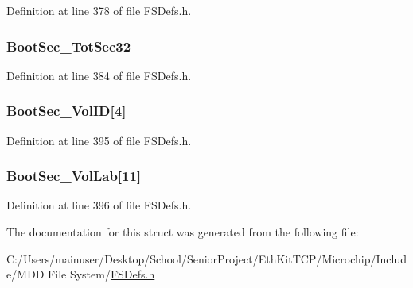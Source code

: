 Definition at line 378 of file F\+S\+Defs.\+h.

\hypertarget{struct___b_p_b___f_a_t32_a867bdbe858dc39c8c08816c22e136180}{}
\subsubsection[{Boot\+Sec\+\_\+\+Tot\+Sec32}]{ Boot\+Sec\+\_\+\+Tot\+Sec32}\label{struct___b_p_b___f_a_t32_a867bdbe858dc39c8c08816c22e136180}


Definition at line 384 of file F\+S\+Defs.\+h.

\hypertarget{struct___b_p_b___f_a_t32_a19b97dc43f9c18bf43e56c688f62adac}{}
\subsubsection[{Boot\+Sec\+\_\+\+Vol\+I\+D}]{ Boot\+Sec\+\_\+\+Vol\+I\+D\mbox{[}4\mbox{]}}\label{struct___b_p_b___f_a_t32_a19b97dc43f9c18bf43e56c688f62adac}


Definition at line 395 of file F\+S\+Defs.\+h.

\hypertarget{struct___b_p_b___f_a_t32_a34d3ba193b23a25841d0bb1896f87889}{}
\subsubsection[{Boot\+Sec\+\_\+\+Vol\+Lab}]{ Boot\+Sec\+\_\+\+Vol\+Lab\mbox{[}11\mbox{]}}\label{struct___b_p_b___f_a_t32_a34d3ba193b23a25841d0bb1896f87889}


Definition at line 396 of file F\+S\+Defs.\+h.



The documentation for this struct was generated from the following file\+:\begin{DoxyCompactItemize}
\item 
C\+:/\+Users/mainuser/\+Desktop/\+School/\+Senior\+Project/\+Eth\+Kit\+T\+C\+P/\+Microchip/\+Include/\+M\+D\+D File System/\hyperlink{_f_s_defs_8h}{F\+S\+Defs.\+h}\end{DoxyCompactItemize}
